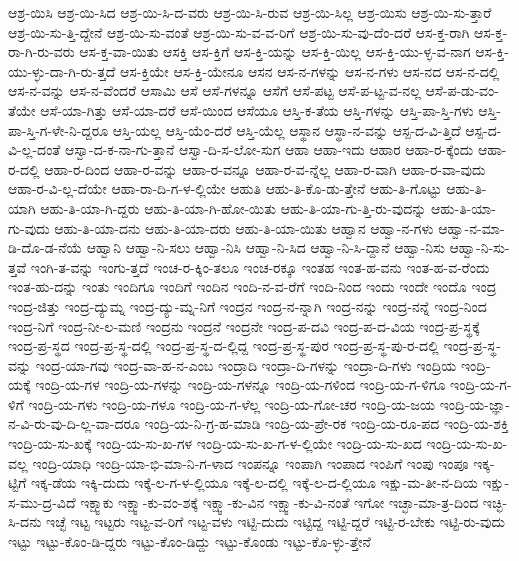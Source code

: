 {ಆಶ್ರ-ಯಿಸಿ
ಆಶ್ರ-ಯಿ-ಸಿದ
ಆಶ್ರ-ಯಿ-ಸಿ-ದ-ವರು
ಆಶ್ರ-ಯಿ-ಸಿ-ರುವ
ಆಶ್ರ-ಯಿ-ಸಿಲ್ಲ
ಆಶ್ರ-ಯಿಸು
ಆಶ್ರ-ಯಿ-ಸು-ತ್ತಾರೆ
ಆಶ್ರ-ಯಿ-ಸು-ತ್ತಿ-ದ್ದೇನೆ
ಆಶ್ರ-ಯಿ-ಸು-ವಂತೆ
ಆಶ್ರ-ಯಿ-ಸು-ವ-ವ-ರಿಗೆ
ಆಶ್ರ-ಯಿ-ಸು-ವು-ದೆಂ-ದರೆ
ಆಸ-ಕ್ತ-ರಾಗಿ
ಆಸ-ಕ್ತ-ರಾ-ಗಿ-ರು-ವರು
ಆಸ-ಕ್ತ-ವಾ-ಯಿತು
ಆಸಕ್ತಿ
ಆಸ-ಕ್ತಿಗೆ
ಆಸ-ಕ್ತಿ-ಯನ್ನು
ಆಸ-ಕ್ತಿ-ಯಿಲ್ಲ
ಆಸ-ಕ್ತಿ-ಯು-ಳ್ಳ-ವ-ನಾಗ
ಆಸ-ಕ್ತಿ-ಯು-ಳ್ಳು-ದಾ-ಗಿ-ರು-ತ್ತದೆ
ಆಸ-ಕ್ತಿಯೇ
ಆಸ-ಕ್ತಿ-ಯೇನೂ
ಆಸನ
ಆಸ-ನ-ಗಳನ್ನು
ಆಸ-ನ-ಗಳು
ಆಸ-ನದ
ಆಸ-ನ-ದಲ್ಲಿ
ಆಸ-ನ-ವನ್ನು
ಆಸ-ನ-ವೆಂದರೆ
ಆಸಾಮಿ
ಆಸೆ
ಆಸೆ-ಗಳನ್ನೂ
ಆಸೆಗೆ
ಆಸೆ-ಪಟ್ಟ
ಆಸೆ-ಪ-ಟ್ಟ-ವ-ನಲ್ಲ
ಆಸೆ-ಪ-ಡು-ವಂ-ತೆಯೇ
ಆಸೆ-ಯಾ-ಗಿತ್ತು
ಆಸೆ-ಯಾ-ದರೆ
ಆಸೆ-ಯಿಂದ
ಆಸೆಯೂ
ಆಸ್ತಿ-ಕ-ತೆಯ
ಆಸ್ತಿ-ಗಳನ್ನು
ಆಸ್ತಿ-ಪಾ-ಸ್ತಿ-ಗಳು
ಆಸ್ತಿ-ಪಾ-ಸ್ತಿ-ಗ-ಳೇ-ನಿ-ದ್ದರೂ
ಆಸ್ತಿ-ಯಲ್ಲ
ಆಸ್ತಿ-ಯೆಂ-ದರೆ
ಆಸ್ತಿ-ಯೆಲ್ಲ
ಆಸ್ಥಾನ
ಆಸ್ಥಾ-ನ-ವನ್ನು
ಆಸ್ಪ-ದ-ವಿ-ತ್ತಿದೆ
ಆಸ್ಪ-ದ-ವಿ-ಲ್ಲ-ದಂತೆ
ಆಸ್ವಾ-ದ-ಕ-ನಾ-ಗು-ತ್ತಾನೆ
ಆಸ್ವಾ-ದಿ-ಸ-ಲೋ-ಸುಗ
ಆಹಾ
ಆಹಾ-ಇದು
ಆಹಾರ
ಆಹಾ-ರ-ಕ್ಕೆಂದು
ಆಹಾ-ರ-ದಲ್ಲಿ
ಆಹಾ-ರ-ದಿಂದ
ಆಹಾ-ರ-ವನ್ನು
ಆಹಾ-ರ-ವನ್ನೂ
ಆಹಾ-ರ-ವ-ನ್ನೆಲ್ಲ
ಆಹಾ-ರ-ವಾಗಿ
ಆಹಾ-ರ-ವಾ-ವುದು
ಆಹಾ-ರ-ವಿ-ಲ್ಲ-ದೆಯೇ
ಆಹಾ-ರಾ-ದಿ-ಗ-ಳ-ಲ್ಲಿಯೇ
ಆಹುತಿ
ಆಹು-ತಿ-ಕೊ-ಡು-ತ್ತೇನೆ
ಆಹು-ತಿ-ಗೊಟ್ಟು
ಆಹು-ತಿ-ಯಾಗಿ
ಆಹು-ತಿ-ಯಾ-ಗಿ-ದ್ದರು
ಆಹು-ತಿ-ಯಾ-ಗಿ-ಹೋ-ಯಿತು
ಆಹು-ತಿ-ಯಾ-ಗು-ತ್ತಿ-ರು-ವುದನ್ನು
ಆಹು-ತಿ-ಯಾ-ಗು-ವುದು
ಆಹು-ತಿ-ಯಾ-ದನು
ಆಹು-ತಿ-ಯಾ-ದರು
ಆಹು-ತಿ-ಯಾ-ಯಿತು
ಆಹ್ವಾನ
ಆಹ್ವಾ-ನ-ಗಳು
ಆಹ್ವಾ-ನ-ಮಾ-ಡಿ-ದೊ-ಡ-ನೆಯೆ
ಆಹ್ವಾನಿ
ಆಹ್ವಾ-ನಿ-ಸಲು
ಆಹ್ವಾ-ನಿಸಿ
ಆಹ್ವಾ-ನಿ-ಸಿದ
ಆಹ್ವಾ-ನಿ-ಸಿ-ದ್ದಾನೆ
ಆಹ್ವಾ-ನಿಸು
ಆಹ್ವಾ-ನಿ-ಸು-ತ್ತವೆ
ಇಂಗಿ-ತ-ವನ್ನು
ಇಂಗು-ತ್ತದೆ
ಇಂಚ-ರ-ಕ್ಕಿಂ-ತಲೂ
ಇಂಚ-ರಕ್ಕೂ
ಇಂತಹ
ಇಂತ-ಹ-ವನು
ಇಂತ-ಹ-ವ-ರೆಂದು
ಇಂತ-ಹು-ದನ್ನು
ಇಂತು
ಇಂದಿಗೂ
ಇಂದಿಗೆ
ಇಂದಿನ
ಇಂದಿ-ನ-ವ-ರೆಗೆ
ಇಂದಿ-ನಿಂದ
ಇಂದು
ಇಂದೇ
ಇಂದೊ
ಇಂದ್ರ
ಇಂದ್ರ-ಜಿತ್ತು
ಇಂದ್ರ-ದ್ಯುಮ್ನ
ಇಂದ್ರ-ದ್ಯು-ಮ್ನ-ನಿಗೆ
ಇಂದ್ರನ
ಇಂದ್ರ-ನ-ನ್ನಾಗಿ
ಇಂದ್ರ-ನನ್ನು
ಇಂದ್ರ-ನನ್ನೆ
ಇಂದ್ರ-ನಿಂದ
ಇಂದ್ರ-ನಿಗೆ
ಇಂದ್ರ-ನೀ-ಲ-ಮಣಿ
ಇಂದ್ರನು
ಇಂದ್ರನೆ
ಇಂದ್ರನೇ
ಇಂದ್ರ-ಪ-ದವಿ
ಇಂದ್ರ-ಪ-ದ-ವಿಯ
ಇಂದ್ರ-ಪ್ರ-ಸ್ಥಕ್ಕೆ
ಇಂದ್ರ-ಪ್ರ-ಸ್ಥದ
ಇಂದ್ರ-ಪ್ರ-ಸ್ಥ-ದಲ್ಲಿ
ಇಂದ್ರ-ಪ್ರ-ಸ್ಥ-ದ-ಲ್ಲಿದ್ದ
ಇಂದ್ರ-ಪ್ರ-ಸ್ಥ-ಪುರ
ಇಂದ್ರ-ಪ್ರ-ಸ್ಥ-ಪು-ರ-ದಲ್ಲಿ
ಇಂದ್ರ-ಪ್ರ-ಸ್ಥ-ವನ್ನು
ಇಂದ್ರ-ಯಾ-ಗವು
ಇಂದ್ರ-ವಾ-ಹ-ನ-ಎಂಬ
ಇಂದ್ರಾದಿ
ಇಂದ್ರಾ-ದಿ-ಗಳನ್ನು
ಇಂದ್ರಾ-ದಿ-ಗಳು
ಇಂದ್ರಿಯ
ಇಂದ್ರಿ-ಯಕ್ಕೆ
ಇಂದ್ರಿ-ಯ-ಗಳ
ಇಂದ್ರಿ-ಯ-ಗಳನ್ನು
ಇಂದ್ರಿ-ಯ-ಗಳನ್ನೂ
ಇಂದ್ರಿ-ಯ-ಗಳಿಂದ
ಇಂದ್ರಿ-ಯ-ಗ-ಳಿಗೂ
ಇಂದ್ರಿ-ಯ-ಗ-ಳಿಗೆ
ಇಂದ್ರಿ-ಯ-ಗಳು
ಇಂದ್ರಿ-ಯ-ಗಳೂ
ಇಂದ್ರಿ-ಯ-ಗ-ಳೆಲ್ಲ
ಇಂದ್ರಿ-ಯ-ಗೋ-ಚರ
ಇಂದ್ರಿ-ಯ-ಜಯ
ಇಂದ್ರಿ-ಯ-ಜ್ಞಾ-ನ-ವಿ-ರು-ವು-ದಿ-ಲ್ಲ-ವಾ-ದರೂ
ಇಂದ್ರಿ-ಯ-ನಿ-ಗ್ರ-ಹ-ಮಾಡಿ
ಇಂದ್ರಿ-ಯ-ಪ್ರೇ-ರಕ
ಇಂದ್ರಿ-ಯ-ರೂ-ಪದ
ಇಂದ್ರಿ-ಯ-ಶಕ್ತಿ
ಇಂದ್ರಿ-ಯ-ಸು-ಖಕ್ಕೆ
ಇಂದ್ರಿ-ಯ-ಸು-ಖ-ಗಳ
ಇಂದ್ರಿ-ಯ-ಸು-ಖ-ಗ-ಳ-ಲ್ಲಿಯೇ
ಇಂದ್ರಿ-ಯ-ಸು-ಖದ
ಇಂದ್ರಿ-ಯ-ಸು-ಖ-ವಲ್ಲ
ಇಂದ್ರಿ-ಯಾಧಿ
ಇಂದ್ರಿ-ಯಾ-ಭಿ-ಮಾ-ನಿ-ಗ-ಳಾದ
ಇಂಪನ್ನೂ
ಇಂಪಾಗಿ
ಇಂಪಾದ
ಇಂಪಿಗೆ
ಇಂಪು
ಇಂಪೂ
ಇಕ್ಕ-ಟ್ಟಿಗೆ
ಇಕ್ಕ-ಡೆಯ
ಇಕ್ಕಿ-ದುದು
ಇಕ್ಕೆ-ಲ-ಗ-ಳ-ಲ್ಲಿಯೂ
ಇಕ್ಕೆ-ಲ-ದಲ್ಲಿ
ಇಕ್ಕೆ-ಲ-ದ-ಲ್ಲಿಯೂ
ಇಕ್ಷು-ಮ-ತೀ-ನ-ದಿಯ
ಇಕ್ಷು-ಸ-ಮು-ದ್ರ-ವಿದೆ
ಇಕ್ಷ್ವಾಕು
ಇಕ್ಷ್ವಾ-ಕು-ವಂ-ಶಕ್ಕೆ
ಇಕ್ಷ್ವಾ-ಕು-ವಿನ
ಇಕ್ಷ್ವಾ-ಕು-ವಿ-ನಂತೆ
ಇಗೋ
ಇಚ್ಛಾ-ಮಾ-ತ್ರ-ದಿಂದ
ಇಚ್ಛಿ-ಸಿ-ದನು
ಇಚ್ಛೆ
ಇಟ್ಟ
ಇಟ್ಟರು
ಇಟ್ಟ-ವ-ರಿಗೆ
ಇಟ್ಟ-ವಳು
ಇಟ್ಟಿ-ದುದು
ಇಟ್ಟಿದ್ದ
ಇಟ್ಟಿ-ದ್ದರೆ
ಇಟ್ಟಿ-ರ-ಬೇಕು
ಇಟ್ಟಿ-ರು-ವುದು
ಇಟ್ಟು
ಇಟ್ಟು-ಕೊಂ-ಡಿ-ದ್ದರು
ಇಟ್ಟು-ಕೊಂ-ಡಿದ್ದು
ಇಟ್ಟು-ಕೊಂಡು
ಇಟ್ಟು-ಕೊ-ಳ್ಳು-ತ್ತೇನೆ
}
